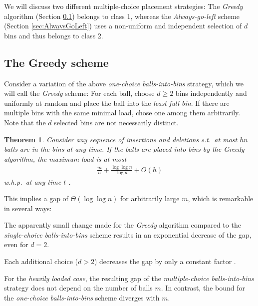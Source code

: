 \documentclass[a4paper,12pt]{article}
\newcommand\todo[1]{\textcolor{red}{(TODO: #1)}}
\newtheorem{theorem}{Theorem}
\begin{document}
We will discuss two different multiple-choice placement strategies: The \emph{Greedy} algorithm (Section \ref{sec:greedy}) belongs to class 1, whereas the \emph{Always-go-left} scheme (Section \ref{sec:AlwaysGoLeft}) uses a non-uniform and independent selection of $d$ bins and thus belongs to class 2.

\subsection{The Greedy scheme}
\label{sec:greedy}

Consider a variation of the above \emph{one-choice balls-into-bins} strategy, which we will call the \emph{Greedy} scheme: For each ball, choose $d \geq 2$ bins independently and uniformly at random and place the ball into the \emph{least full bin}. If there are multiple bins with the same minimal load, chose one among them arbitrarily. Note that the $d$ selected bins are not necessarily distinct. 

\begin{theorem}
\label{theorem:greedy}
Consider any sequence of insertions and deletions s.t.~at most $hn$ balls are in the bins at any time. If the balls are placed into bins by the Greedy algorithm, the maximum load is at most 
\begin{align}
\frac{m}{n} + \frac{\log \log n}{\log d}+ O(h)
\end{align}
w.h.p.~at any time $t$ \cite{ABKU99} \cite{BCSV06}.
\end{theorem}

This implies a gap of $\Theta\left(\log \log n \right)$ for arbitrarily large $m$, which is remarkable in several ways:
\begin{compactitem}
\item The apparently small change made for the \emph{Greedy} algorithm compared to the \emph{single-choice balls-into-bins} scheme results in an exponential decrease of the gap, even for $d=2$. 
\item Each additional choice ($d > 2$) decreases the gap by only a constant factor \cite{MRS01}. 
\item For the \emph{heavily loaded case}, the resulting gap of the \emph{multiple-choice balls-into-bins} strategy does not depend on the number of balls $m$. In contrast, the bound for the \emph{one-choice balls-into-bins} scheme diverges with $m$.
\begin{comment}
\todo{the following is only true for class 1 algorithms}
\item The given bounds are \emph{tight}, meaning that no other strategy that places each ball into one of $d$ randomly selected bins achieves a gap that is asymptotically lower.
\end{comment}
\end{compactitem}
\end{document}
